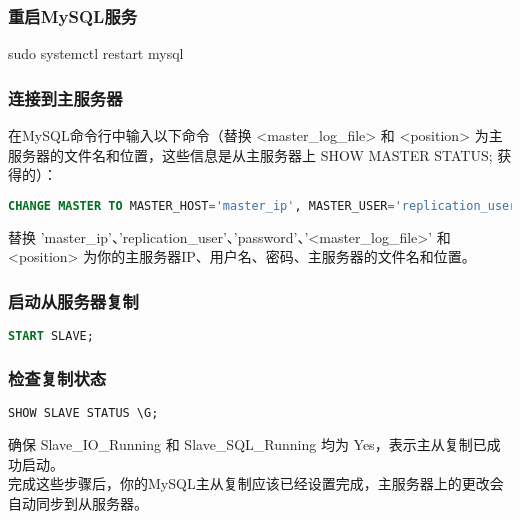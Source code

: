 \documentclass[12pt,twiside,a4paper]{book}
\numberwithin{chapter}{part}
\begin{document}
\subsubsection{重启MySQL服务}
sudo systemctl restart mysql
\subsubsection{连接到主服务器}
在MySQL命令行中输入以下命令（替换 <master\_log\_file> 和 <position> 为主服务器的文件名和位置，这些信息是从主服务器上 SHOW MASTER STATUS; 获得的）：
\begin{lstlisting}[language=sql,breaklines = true]
CHANGE MASTER TO MASTER_HOST='master_ip', MASTER_USER='replication_user', MASTER_PASSWORD='password', MASTER_LOG_FILE='<master_log_file>', MASTER_LOG_POS=<position>;
\end{lstlisting}
替换 'master\_ip'、'replication\_user'、'password'、'<master\_log\_file>' 和 <position> 为你的主服务器IP、用户名、密码、主服务器的文件名和位置。
\subsubsection{启动从服务器复制}
\begin{lstlisting}[language=sql,breaklines = true]
START SLAVE;
\end{lstlisting}
\subsubsection{检查复制状态}
\begin{lstlisting}[language=sql,breaklines = true]
SHOW SLAVE STATUS \G;
\end{lstlisting}
确保 Slave\_IO\_Running 和 Slave\_SQL\_Running 均为 Yes，表示主从复制已成功启动。\\
完成这些步骤后，你的MySQL主从复制应该已经设置完成，主服务器上的更改会自动同步到从服务器。
\end{document}
